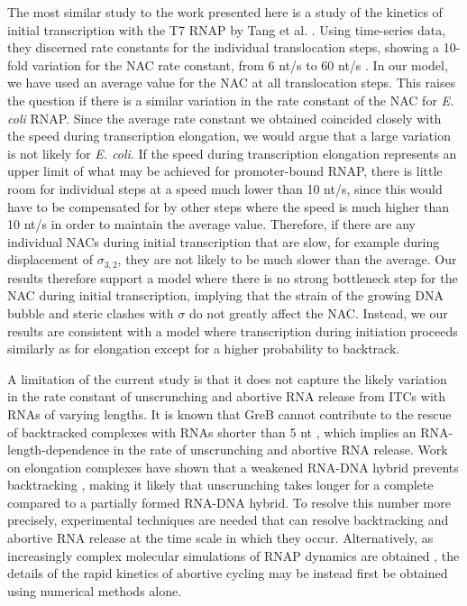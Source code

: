 The most similar study to the work presented here is a study of the kinetics
of initial transcription with the T7 RNAP by Tang et al.
\cite{tang_real-time_2009}. Using time-series data, they discerned rate
constants for the individual translocation steps, showing a 10-fold variation
for the NAC rate constant, from 6 nt/s to 60 nt/s
\cite{tang_real-time_2009}. In our model, we have used an average value for
the NAC at all translocation steps. This raises the question if there is a
similar variation in the rate constant of the NAC for \textit{E. coli} RNAP.
Since the average rate constant we obtained coincided closely with the speed
during transcription elongation, we would argue that a large variation is
not likely for \textit{E. coli}. If the speed during transcription
elongation represents an upper limit of what may be achieved for
promoter-bound RNAP, there is little room for individual steps at a speed much
lower than 10 nt/s, since this would have to be compensated for by other
steps where the speed is much higher than 10 nt/s in order to maintain the
average value. Therefore, if there are any individual NACs during initial
transcription that are slow, for example during displacement of
$\sigma_{3,2}$, they are not likely to be much slower than the average. Our
results therefore support a model where there is no strong bottleneck step for
the NAC during initial transcription, implying that the strain of the growing
DNA bubble and steric clashes with $\sigma$ do not greatly affect the NAC.
Instead, we our results are consistent with a model where transcription during
initiation proceeds similarly as for elongation except for a higher
probability to backtrack.

A limitation of the current study is that it does not capture the likely
variation in the rate constant of unscrunching and abortive RNA release from
ITCs with RNAs of varying lengths. It is known that GreB cannot
contribute to the rescue of backtracked complexes with RNAs shorter than 5 nt
\cite{hsu_initial_2006}, which implies an RNA-length-dependence in the rate of
unscrunching and abortive RNA release. Work on elongation complexes have shown
that a weakened RNA-DNA hybrid prevents backtracking
\cite{nudler_rnadna_1997}, making it likely that unscrunching takes longer for
a complete compared to a partially formed RNA-DNA hybrid. To resolve this
number more precisely, experimental techniques are needed that can resolve
backtracking and abortive RNA release at the time scale in which they occur.
Alternatively, as increasingly complex molecular simulations of RNAP dynamics
are obtained \cite{silva_millisecond_2014}, the details of the rapid kinetics
of abortive cycling may be instead first be obtained using numerical methods
alone.


